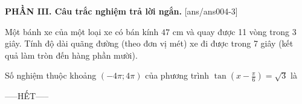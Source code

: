 \documentclass[12pt,a4paper]{article}
\begin{document}
{\bf PHẦN III. Câu trắc nghiệm trả lời ngắn.}
\setcounter{ex}{0}
[ans/ans004-3]
\begin{ex}
 Một bánh xe của một loại xe có bán kính ${47}$ cm và quay được 11 vòng trong 3 giây. Tính độ dài quãng đường (theo đơn vị mét) xe đi được trong 7 giây (kết quả làm tròn đến hàng phần mười). 

\end{ex}

\begin{ex}
 Số nghiệm thuộc khoảng $(- 4 \pi;4 \pi)$ của phương trình $\tan \left(x - \frac{\pi}{6}\right)=\sqrt{3}$ là

\end{ex}


 \begin{center}
-----HẾT-----
\end{center}

\newpage 
\end{document}
